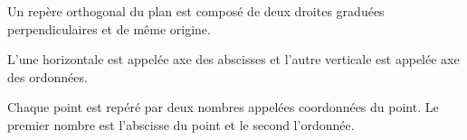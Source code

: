 \documentclass[a4paper,10pt]{report}
\begin{document}
\vspace{-8mm}
\noindent \begin{minipage}{10cm}
\begin{defn}
Un repère orthogonal du plan est composé de deux droites graduées perpendiculaires et de même origine. 

\medskip
\noindent L'une horizontale est appelée axe des abscisses et l'autre verticale est appelée axe des ordonnées.
\end{defn}
\end{minipage}
\hspace{5mm}
\begin{minipage}{6cm}
\begin{center}
\end{center}
\end{minipage}

\begin{defn}
Chaque point est repéré par deux nombres appelées coordonnées du point. Le premier nombre est l'abscisse du point et le second l'ordonnée.
\end{defn}
\end{document}
